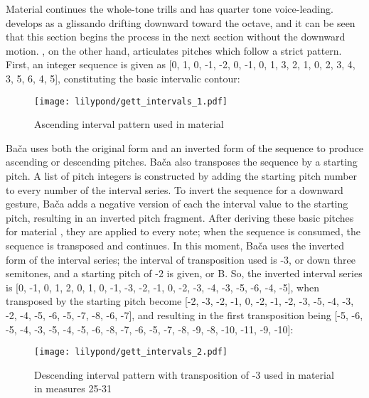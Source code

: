Material  continues the whole-tone trills and  has quarter tone voice-leading.  develops as a glissando drifting downward toward the octave, and it can be seen that this section begins the process in the next section without the downward motion. , on the other hand, articulates pitches which follow a strict pattern. First, an integer sequence is given as [0, 1, 0, -1, -2, 0, -1, 0, 1, 3, 2, 1, 0, 2, 3, 4, 3, 5, 6, 4, 5], constituting the basic intervalic contour:

\setcounter{figure}{23}
\setcounter{subFigure}{0}
\renewcommand{\thefigure}{\thechapter.\arabic{figure}}
\begin{figure}[H]
    \texttt{[image: lilypond/gett\_intervals\_1.pdf]}
    \caption{Ascending interval pattern used in material }
    \label{fig:gett-intervals-1}
\end{figure}

Bača uses both the original form and an inverted form of the sequence to produce ascending or descending pitches. Bača also transposes the sequence by a starting pitch. A list of pitch integers is constructed by adding the starting pitch number to every number of the interval series. To invert the sequence for a downward gesture, Bača adds a negative version of each the interval value to the starting pitch, resulting in an inverted pitch fragment. After deriving these basic pitches for material , they are applied to every note; when the sequence is consumed, the sequence is transposed and continues. In this moment, Bača uses the inverted form of the interval series; the interval of transposition used is -3, or down three semitones, and a starting pitch of -2 is given, or B. So, the inverted interval series is [0, -1, 0, 1, 2, 0, 1, 0, -1, -3, -2, -1, 0, -2, -3, -4, -3, -5, -6, -4, -5], when transposed by the starting pitch become [-2, -3, -2, -1, 0, -2, -1, -2, -3, -5, -4, -3, -2, -4, -5, -6, -5, -7, -8, -6, -7], and resulting in the first transposition being [-5, -6, -5, -4, -3, -5, -4, -5, -6, -8, -7, -6, -5, -7, -8, -9, -8, -10, -11, -9, -10]:

\setcounter{figure}{24}
\begin{figure}[H]
    \texttt{[image: lilypond/gett\_intervals\_2.pdf]}
    \caption{Descending interval pattern with transposition of -3 used in material  in measures 25-31}
    \label{fig:gett-intervals-2}
\end{figure}

